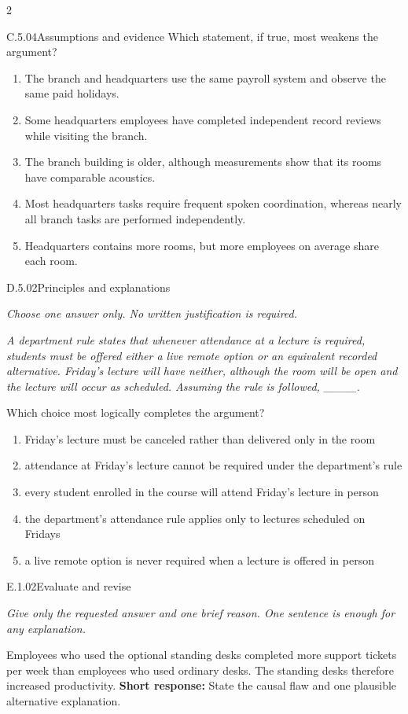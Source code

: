 \documentclass[9pt]{extarticle}
\newcommand{\choice}[1]{\item #1}
\begin{document}
\begin{multicols}{2}
\begin{DenseCoreProblem}{C.5.04}{Assumptions and evidence}
Which statement, if true, most weakens the argument?
\begin{enumerate}[label=(\alph*)]
  \choice{The branch and headquarters use the same payroll system and observe the same paid holidays.}
  \choice{Some headquarters employees have completed independent record reviews while visiting the branch.}
  \choice{The branch building is older, although measurements show that its rooms have comparable acoustics.}
  \choice{Most headquarters tasks require frequent spoken coordination, whereas nearly all branch tasks are performed independently.}
  \choice{Headquarters contains more rooms, but more employees on average share each room.}
\end{enumerate}
\end{DenseCoreProblem}
\begin{DenseCoreProblem}{D.5.02}{Principles and explanations}
{\scriptsize\textit{Choose one answer only. No written justification is required.}\par}
\emph{A department rule states that whenever attendance at a lecture is required, students must be offered either a live remote option or an equivalent recorded alternative. Friday's lecture will have neither, although the room will be open and the lecture will occur as scheduled. Assuming the rule is followed, \_\_\_\_.}

Which choice most logically completes the argument?
\begin{enumerate}[label=(\alph*)]
  \choice{Friday's lecture must be canceled rather than delivered only in the room}
  \choice{attendance at Friday's lecture cannot be required under the department's rule}
  \choice{every student enrolled in the course will attend Friday's lecture in person}
  \choice{the department's attendance rule applies only to lectures scheduled on Fridays}
  \choice{a live remote option is never required when a lecture is offered in person}
\end{enumerate}
\end{DenseCoreProblem}
\begin{DenseCoreProblem}{E.1.02}{Evaluate and revise}
{\scriptsize\textit{Give only the requested answer and one brief reason. One sentence is enough for any explanation.}\par}
Employees who used the optional standing desks completed more support tickets per week than employees who used ordinary desks. The standing desks therefore increased productivity.
\textbf{Short response:} State the causal flaw and one plausible alternative explanation.
\end{DenseCoreProblem}
\end{multicols}
\end{document}
